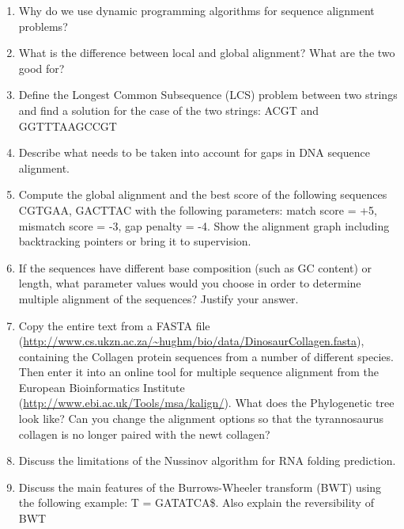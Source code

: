 \documentclass[11pt,runningheads,a4paper]{article}
\begin{document}
\begin{enumerate}
	\item Why do we use dynamic programming algorithms for sequence alignment problems?

	\item What is the difference between local and global alignment? What are the two good for?

	\item Define the Longest Common Subsequence (LCS) problem between two strings and find a solution for the case of the two strings: ACGT and GGTTTAAGCCGT

	\item Describe what needs to be taken into account for gaps in DNA sequence alignment.

	\item Compute the global alignment and the best score of the following sequences CGTGAA, GACTTAC with the following parameters: match score = +5, mismatch score = -3, gap penalty = -4. Show the alignment graph including backtracking pointers or bring it to supervision.

	\item If the sequences have different base composition (such as GC content) or length, what parameter values would you choose in order to determine multiple alignment of the sequences?  Justify your answer.





	\item Copy the entire text from a FASTA file (\url{http://www.cs.ukzn.ac.za/~hughm/bio/data/DinosaurCollagen.fasta}), containing the Collagen protein sequences from a number of different species. Then enter it into an online tool for multiple sequence alignment from the European Bioinformatics Institute (\url{http://www.ebi.ac.uk/Tools/msa/kalign/}). What does the Phylogenetic tree look like? Can you change the alignment options so that the tyrannosaurus collagen is no longer paired with the newt collagen?

	\item Discuss the limitations of the Nussinov algorithm for RNA folding prediction.
	\item Discuss the main features of the Burrows-Wheeler transform (BWT) using the following example: T = GATATCA\$. Also explain the reversibility of BWT
\end{enumerate}
\end{document}
